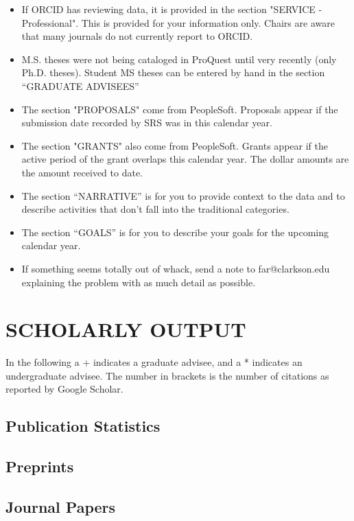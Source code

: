 \documentclass[10pt]{article}
\begin{document}
\begin{itemize}
\item If ORCID has reviewing data, it is provided in the section "SERVICE - Professional".  This is provided for your information only.  Chairs are aware that many journals do not currently report to ORCID.
\item M.S. theses were not being cataloged in ProQuest until very recently (only Ph.D. theses).  Student MS theses can be entered by hand in the section ``GRADUATE ADVISEES''
\item The section "PROPOSALS" come from PeopleSoft.  Proposals appear if the submission date recorded by SRS was in this calendar year.
\item The section "GRANTS" also come from PeopleSoft.  Grants appear if the active period of the grant overlaps this calendar year.  The dollar amounts are the amount received to date.
\item The section ``NARRATIVE''  is for you to provide context to the data and to describe activities that don't fall into the traditional categories.
\item The section ``GOALS'' is for you to describe your goals for the upcoming calendar year.
\item If something seems totally out of whack, send a note to far@clarkson.edu explaining the problem with as much detail as possible.

\end{itemize}

\newpage
\section{SCHOLARLY OUTPUT}
In the following a + indicates a graduate advisee, and a * indicates an undergraduate advisee.  The number in brackets is the number of citations as reported by Google Scholar.

\subsection{Publication Statistics}



\subsection{Preprints}


\subsection{Journal Papers}

\end{document}
